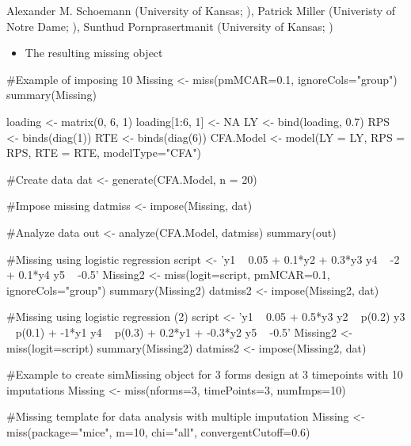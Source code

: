 \documentclass[a4paper]{book}
\begin{document}
%
\begin{Author}\relax
Alexander M. Schoemann (University of Kansas; ), 
Patrick Miller (Univeristy of Notre Dame; ), 
Sunthud Pornprasertmanit (University of Kansas; )
\end{Author}
%
\begin{SeeAlso}\relax
\begin{itemize}

\item {} The resulting missing object

\end{itemize}

\end{SeeAlso}
%
\begin{Examples}
\begin{ExampleCode}
#Example of imposing 10%
Missing <- miss(pmMCAR=0.1, ignoreCols="group")
summary(Missing)

loading <- matrix(0, 6, 1)
loading[1:6, 1] <- NA
LY <- bind(loading, 0.7)
RPS <- binds(diag(1))
RTE <- binds(diag(6))
CFA.Model <- model(LY = LY, RPS = RPS, RTE = RTE, modelType="CFA")

#Create data
dat <- generate(CFA.Model, n = 20)

#Impose missing
datmiss <- impose(Missing, dat)

#Analyze data
out <- analyze(CFA.Model, datmiss)
summary(out)

#Missing using logistic regression
script <- 'y1 ~ 0.05 + 0.1*y2 + 0.3*y3
	y4 ~ -2 + 0.1*y4
	y5 ~ -0.5' 
Missing2 <- miss(logit=script, pmMCAR=0.1, ignoreCols="group")
summary(Missing2)
datmiss2 <- impose(Missing2, dat)

#Missing using logistic regression (2)
script <- 'y1 ~ 0.05 + 0.5*y3
	y2 ~ p(0.2)
	y3 ~ p(0.1) + -1*y1
	y4 ~ p(0.3) + 0.2*y1 + -0.3*y2
	y5 ~ -0.5' 
Missing2 <- miss(logit=script)
summary(Missing2)
datmiss2 <- impose(Missing2, dat)

#Example to create simMissing object for 3 forms design at 3 timepoints with 10 imputations
Missing <- miss(nforms=3, timePoints=3, numImps=10)

#Missing template for data analysis with multiple imputation
Missing <- miss(package="mice", m=10, chi="all", convergentCutoff=0.6)
\end{ExampleCode}
\end{Examples}
\end{document}
